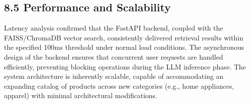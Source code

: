 \subsection*{8.5 Performance and Scalability}
Latency analysis confirmed that the FastAPI backend, coupled with the FAISS/ChromaDB vector search, consistently delivered retrieval results within the specified 100ms threshold under normal load conditions. The asynchronous design of the backend ensures that concurrent user requests are handled efficiently, preventing blocking operations during the LLM inference phase. The system architecture is inherently scalable, capable of accommodating an expanding catalog of products across new categories (e.g., home appliances, apparel) with minimal architectural modifications.


